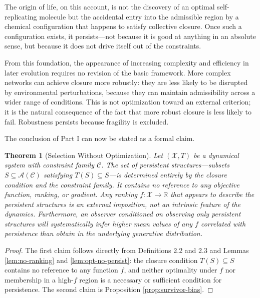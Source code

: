 \documentclass[12pt, a4paper, oneside]{article}
\theoremstyle{plain}
\newtheorem{theorem}{Theorem}[section]
\theoremstyle{definition}
\theoremstyle{remark}
\newcommand{\X}{\mathcal{X}}
\newcommand{\C}{\mathcal{C}}
\newcommand{\A}{\mathcal{A}}
\newcommand{\T}{T}
\begin{document}
The origin of life, on this account, is not the discovery of an optimal self-replicating molecule but the accidental entry into the admissible region by a chemical configuration that happens to satisfy collective closure. Once such a configuration exists, it persists---not because it is good at anything in an absolute sense, but because it does not drive itself out of the constraints.

From this foundation, the appearance of increasing complexity and efficiency in later evolution requires no revision of the basic framework. More complex networks can achieve closure more robustly: they are less likely to be disrupted by environmental perturbations, because they can maintain admissibility across a wider range of conditions. This is not optimization toward an external criterion; it is the natural consequence of the fact that more robust closure is less likely to fail. Robustness persists because fragility is excluded.

The conclusion of Part I can now be stated as a formal claim.

\begin{theorem}[Selection Without Optimization]
\label{thm:no-opt}
Let $(\X, \T)$ be a dynamical system with constraint family $\C$. The set of persistent structures---subsets $S \subseteq \A(\C)$ satisfying $\T(S) \subseteq S$---is determined entirely by the closure condition and the constraint family. It contains no reference to any objective function, ranking, or gradient. Any ranking $f : \X \to \mathbb{R}$ that appears to describe the persistent structures is an external imposition, not an intrinsic feature of the dynamics. Furthermore, an observer conditioned on observing only persistent structures will systematically infer higher mean values of any $f$ correlated with persistence than obtain in the underlying generative distribution.
\end{theorem}

\begin{proof}
The first claim follows directly from Definitions 2.2 and 2.3 and Lemmas \ref{lem:no-ranking} and \ref{lem:opt-no-persist}: the closure condition $\T(S) \subseteq S$ contains no reference to any function $f$, and neither optimality under $f$ nor membership in a high-$f$ region is a necessary or sufficient condition for persistence. The second claim is Proposition \ref{prop:survivor-bias}.
\end{proof}

\end{document}
